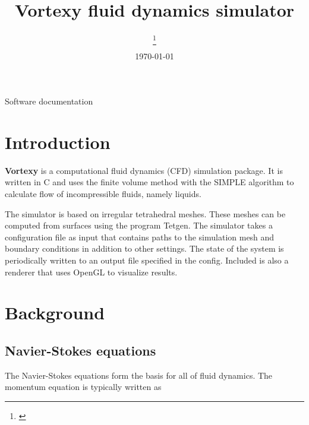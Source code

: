 \documentclass[12pt]{article}
\title {
  Vortexy fluid dynamics simulator
}
\date{\today}
\author[1] {
  \firstauth\thanks{\href{mailto: \email}{\email}}
}
\begin{document}
\setlength{\belowcaptionskip}{10pt}


\normalsize

\begin{titlingpage}
  \maketitle

  \begin{center}
    Software documentation
  \end{center}
\end{titlingpage}

\newpage

\tableofcontents

\newpage

\section{Introduction}

{\bf Vortexy} is a computational fluid dynamics (CFD) simulation package. It is written in C and uses the finite volume method with the SIMPLE algorithm to calculate flow of incompressible fluids, namely liquids.

The simulator is based on irregular tetrahedral meshes. These meshes can be computed from surfaces using the program Tetgen. The simulator takes a configuration file as input that contains paths to the simulation mesh and boundary conditions in addition to other settings. The state of the system is periodically written to an output file specified in the config. Included is also a renderer that uses OpenGL to visualize results.

\section{Background}

\subsection{Navier-Stokes equations}

\noindent

The Navier-Stokes equations form the basis for all of fluid dynamics. The momentum equation is typically written as
\end{document}
